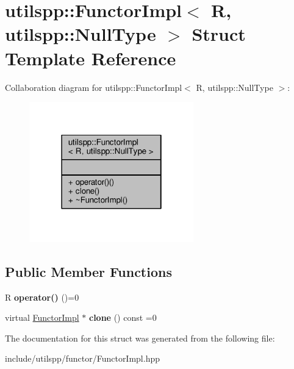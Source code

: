 \hypertarget{structutilspp_1_1FunctorImpl_3_01R_00_01utilspp_1_1NullType_01_4}{\section{utilspp\-:\-:Functor\-Impl$<$ R, utilspp\-:\-:Null\-Type $>$ Struct Template Reference}
\label{structutilspp_1_1FunctorImpl_3_01R_00_01utilspp_1_1NullType_01_4}
}


Collaboration diagram for utilspp\-:\-:Functor\-Impl$<$ R, utilspp\-:\-:Null\-Type $>$\-:
\nopagebreak
\begin{figure}[H]
\begin{center}
\leavevmode
\includegraphics[width=202pt]{structutilspp_1_1FunctorImpl_3_01R_00_01utilspp_1_1NullType_01_4__coll__graph}
\end{center}
\end{figure}
\subsection*{Public Member Functions}
\begin{DoxyCompactItemize}
\item 
\hypertarget{structutilspp_1_1FunctorImpl_3_01R_00_01utilspp_1_1NullType_01_4_a6f337e57bea1af0a0760d6444f66e148}{R {\bfseries operator()} ()=0}\label{structutilspp_1_1FunctorImpl_3_01R_00_01utilspp_1_1NullType_01_4_a6f337e57bea1af0a0760d6444f66e148}

\item 
\hypertarget{structutilspp_1_1FunctorImpl_3_01R_00_01utilspp_1_1NullType_01_4_af30cce7c7b872a2595c7099e0e7d88e2}{virtual \hyperlink{structutilspp_1_1FunctorImpl}{Functor\-Impl} $\ast$ {\bfseries clone} () const =0}\label{structutilspp_1_1FunctorImpl_3_01R_00_01utilspp_1_1NullType_01_4_af30cce7c7b872a2595c7099e0e7d88e2}

\end{DoxyCompactItemize}


The documentation for this struct was generated from the following file\-:\begin{DoxyCompactItemize}
\item 
include/utilspp/functor/Functor\-Impl.\-hpp\end{DoxyCompactItemize}
